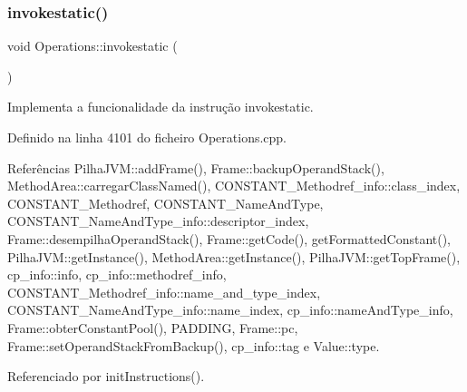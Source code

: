 \subsubsection{\texorpdfstring{invokestatic()}{invokestatic()}}
{\footnotesize\ttfamily void Operations\+::invokestatic (\begin{DoxyParamCaption}{ }\end{DoxyParamCaption})\hspace{0.3cm}{\ttfamily [private]}}



Implementa a funcionalidade da instrução invokestatic. 



Definido na linha 4101 do ficheiro Operations.\+cpp.



Referências Pilha\+J\+V\+M\+::add\+Frame(), Frame\+::backup\+Operand\+Stack(), Method\+Area\+::carregar\+Class\+Named(), C\+O\+N\+S\+T\+A\+N\+T\+\_\+\+Methodref\+\_\+info\+::class\+\_\+index, C\+O\+N\+S\+T\+A\+N\+T\+\_\+\+Methodref, C\+O\+N\+S\+T\+A\+N\+T\+\_\+\+Name\+And\+Type, C\+O\+N\+S\+T\+A\+N\+T\+\_\+\+Name\+And\+Type\+\_\+info\+::descriptor\+\_\+index, Frame\+::desempilha\+Operand\+Stack(), Frame\+::get\+Code(), get\+Formatted\+Constant(), Pilha\+J\+V\+M\+::get\+Instance(), Method\+Area\+::get\+Instance(), Pilha\+J\+V\+M\+::get\+Top\+Frame(), cp\+\_\+info\+::info, cp\+\_\+info\+::methodref\+\_\+info, C\+O\+N\+S\+T\+A\+N\+T\+\_\+\+Methodref\+\_\+info\+::name\+\_\+and\+\_\+type\+\_\+index, C\+O\+N\+S\+T\+A\+N\+T\+\_\+\+Name\+And\+Type\+\_\+info\+::name\+\_\+index, cp\+\_\+info\+::name\+And\+Type\+\_\+info, Frame\+::obter\+Constant\+Pool(), P\+A\+D\+D\+I\+NG, Frame\+::pc, Frame\+::set\+Operand\+Stack\+From\+Backup(), cp\+\_\+info\+::tag e Value\+::type.



Referenciado por init\+Instructions().

